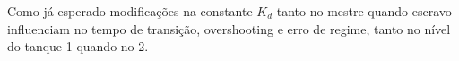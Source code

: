 Como já esperado  modificações na constante $K_d$ tanto no mestre quando escravo influenciam no
tempo de transição, overshooting e erro de regime, tanto no nível do tanque 1 quando no 2.